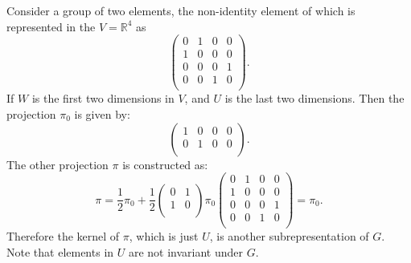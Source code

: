 \documentclass[12pt, letterpaper]{article}
\newcommand{\re}{\mathbb{R}}
\newcommand{\blue}[1]{{\color{blue} #1}}
\theoremstyle{definition}
\theoremstyle{remark}
\theoremstyle{definition}
\theoremstyle{plain}
\numberwithin{equation}{section}
\begin{document}
	Consider a group of two elements, the non-identity element of which is represented in the $V=\re^4$ as
	\begin{equation}
		\begin{pmatrix}
			0 & 1&0&0\\
			1&0&0&0\\
			0&0&0&1\\
			0&0&1&0\\
		\end{pmatrix}.
	\end{equation}
	If $W$ is the first two dimensions in $V$,
	and $U$ is the last two dimensions.
	Then the projection $\pi_0$ is given by:
	\begin{equation}
		\begin{pmatrix}
			1&0&0&0\\
			0&1&0&0\\
		\end{pmatrix}.
	\end{equation}
	The other projection $\pi$ is constructed as:
	\begin{equation}
		\pi=
		\frac{1}{2}\pi_0+
		\frac{1}{2}
		\begin{pmatrix}
			0&1\\
			1&0\\
		\end{pmatrix}
		\pi_0
		\begin{pmatrix}
			0 & 1&0&0\\
			1&0&0&0\\
			0&0&0&1\\
			0&0&1&0\\
		\end{pmatrix}=\pi_0.
	\end{equation}
	Therefore the kernel of $\pi$, which is just $U$,
	is another subrepresentation of $G$.
	\blue{Note that elements in $U$ are not invariant under $G$.}
	
\end{document}
